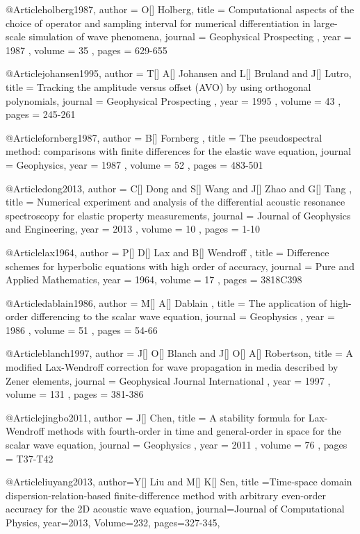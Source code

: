 {@Article{holberg1987,
 author =  { O[] Holberg},
 title =   {Computational aspects of the choice of operator and sampling interval for numerical differentiation in large-scale simulation of wave phenomena},
 journal = { Geophysical Prospecting },
 year =    { 1987 },
 volume =  { 35 },
 pages =   { 629-655 }
}

@Article{johansen1995,
 author =  { T[] A[] Johansen and L[] Bruland and J[] Lutro},
 title =   {Tracking the amplitude versus offset (AVO) by using orthogonal polynomials},
 journal = { Geophysical Prospecting },
 year =    { 1995 },
 volume =  { 43 },
 pages =   { 245-261 }
}

@Article{fornberg1987,
 author =  { B[] Fornberg },
 title =   {The pseudospectral method: comparisons with finite differences for the elastic
wave equation},
 journal = { Geophysics},
 year =    { 1987 },
 volume =  { 52 },
 pages =   { 483-501 }
}

@Article{dong2013,
 author =  { C[] Dong and S[] Wang and J[] Zhao and G[] Tang },
 title =   {Numerical experiment and analysis of the differential acoustic resonance spectroscopy for elastic property measurements},
 journal = { Journal of Geophysics and Engineering},
 year =    { 2013 },
 volume =  { 10 },
 pages =   { 1-10 }
}

@Article{lax1964,
 author =  { P[] D[] Lax and B[] Wendroff },
 title =   {Difference schemes for hyperbolic equations with high order of accuracy},
 journal = { Pure and Applied Mathematics},
 year =    { 1964},
 volume =  { 17 },
 pages =   { 381\A8C398 }
}

@Article{dablain1986,
 author =  { M[] A[] Dablain },
 title =   {The application of high-order differencing to the scalar wave equation},
 journal = { Geophysics },
 year =    { 1986 },
 volume =  { 51 },
 pages =   { 54-66 }
}


@Article{blanch1997,
 author =  { J[] O[] Blanch and J[] O[] A[] Robertson},
 title =   {A modified Lax-Wendroff correction for wave propagation in media described by Zener elements},
 journal = { Geophysical Journal International },
 year =    { 1997 },
 volume =  { 131 },
 pages =   { 381-386 }
}

@Article{jingbo2011,
 author =  { J[] Chen},
 title =   {A stability formula for Lax-Wendroff methods with fourth-order in time and general-order in space for the scalar wave equation},
 journal = { Geophysics },
 year =    { 2011 },
 volume =  { 76 },
 pages =   { T37-T42 }
}

@Article{liuyang2013,
  author={Y[] Liu and M[] K[] Sen},
  title ={Time-space domain dispersion-relation-based finite-difference method with arbitrary even-order accuracy for the 2{D} acoustic wave equation},
  journal={Journal of Computational Physics},
  year=2013,
  Volume=232,
  pages={327-345},
}






}
